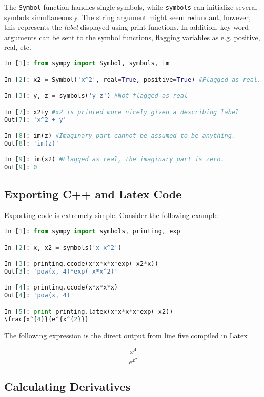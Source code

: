 The \verb+Symbol+ function handles single symbols, while \verb+symbols+ can initialize several symbols simultaneously. The string argument might seem redundant, however, this represents the \textit{label} displayed using print functions. In addition, key word arguments can be sent to the symbol functions, flagging variables as e.g. positive, real, etc.

\begin{lstlisting}[language=Python]
In [1]: from sympy import Symbol, symbols, im

In [2]: x2 = Symbol('x^2', real=True, positive=True) #Flagged as real. Note the label.

In [3]: y, z = symbols('y z') #Not flagged as real

In [7]: x2+y #x2 is printed more nicely given a describing label
Out[7]: 'x^2 + y'

In [8]: im(z) #Imaginary part cannot be assumed to be anything.
Out[8]: 'im(z)'

In [9]: im(x2) #Flagged as real, the imaginary part is zero.
Out[9]: 0

\end{lstlisting}

\subsection{Exporting C++ and Latex Code}

Exporting code is extremely simple. Consider the following example

\begin{lstlisting}[language=Python]
In [1]: from sympy import symbols, printing, exp

In [2]: x, x2 = symbols('x x^2')

In [3]: printing.ccode(x*x*x*x*exp(-x2*x))
Out[3]: 'pow(x, 4)*exp(-x*x^2)'

In [4]: printing.ccode(x*x*x*x)
Out[4]: 'pow(x, 4)'

In [5]: print printing.latex(x*x*x*x*exp(-x2))
\frac{x^{4}}{e^{x^{2}}}

\end{lstlisting}

The following expression is the direct output from line five compiled in Latex

\begin{equation*}
 \frac{x^{4}}{e^{x^{2}}}
\end{equation*}

\subsection{Calculating Derivatives}

